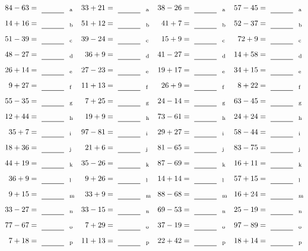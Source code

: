 \documentclass
[
  draft    = true,
  fontsize = 11pt,
  parskip  = half-
]
{scrartcl}
\begin{document}
\clearpage
\begin{align*}
    \pline{84-63}&=\rline{a}
  & \pline{33+21}&=\rline{a}
  & \pline{38-26}&=\rline{a}
  & \pline{57-45}&=\rline{a} \\[1ex]
    \pline{14+16}&=\rline{b}
  & \pline{51+12}&=\rline{b}
  & \pline{41+7}&=\rline{b}
  & \pline{52-37}&=\rline{b} \\[1ex]
    \pline{51-39}&=\rline{c}
  & \pline{39-24}&=\rline{c}
  & \pline{15+9}&=\rline{c}
  & \pline{72+9}&=\rline{c} \\[1ex]
    \pline{48-27}&=\rline{d}
  & \pline{36+9}&=\rline{d}
  & \pline{41-27}&=\rline{d}
  & \pline{14+58}&=\rline{d} \\[1ex]
    \pline{26+14}&=\rline{e}
  & \pline{27-23}&=\rline{e}
  & \pline{19+17}&=\rline{e}
  & \pline{34+15}&=\rline{e} \\[1ex]
    \pline{9+27}&=\rline{f}
  & \pline{11+13}&=\rline{f}
  & \pline{26+9}&=\rline{f}
  & \pline{8+22}&=\rline{f} \\[1ex]
    \pline{55-35}&=\rline{g}
  & \pline{7+25}&=\rline{g}
  & \pline{24-14}&=\rline{g}
  & \pline{63-45}&=\rline{g} \\[1ex]
    \pline{12+44}&=\rline{h}
  & \pline{19+9}&=\rline{h}
  & \pline{73-61}&=\rline{h}
  & \pline{24+24}&=\rline{h} \\[1ex]
    \pline{35+7}&=\rline{i}
  & \pline{97-81}&=\rline{i}
  & \pline{29+27}&=\rline{i}
  & \pline{58-44}&=\rline{i} \\[1ex]
    \pline{18+36}&=\rline{j}
  & \pline{21+6}&=\rline{j}
  & \pline{81-65}&=\rline{j}
  & \pline{83-75}&=\rline{j} \\[1ex]
    \pline{44+19}&=\rline{k}
  & \pline{35-26}&=\rline{k}
  & \pline{87-69}&=\rline{k}
  & \pline{16+11}&=\rline{k} \\[1ex]
    \pline{36+9}&=\rline{l}
  & \pline{9+26}&=\rline{l}
  & \pline{14+14}&=\rline{l}
  & \pline{57+15}&=\rline{l} \\[1ex]
    \pline{9+15}&=\rline{m}
  & \pline{33+9}&=\rline{m}
  & \pline{88-68}&=\rline{m}
  & \pline{16+24}&=\rline{m} \\[1ex]
    \pline{33-27}&=\rline{n}
  & \pline{33-15}&=\rline{n}
  & \pline{69-53}&=\rline{n}
  & \pline{25-19}&=\rline{n} \\[1ex]
    \pline{77-67}&=\rline{o}
  & \pline{7+29}&=\rline{o}
  & \pline{37-19}&=\rline{o}
  & \pline{97-89}&=\rline{o} \\[1ex]
    \pline{7+18}&=\rline{p}
  & \pline{11+13}&=\rline{p}
  & \pline{22+42}&=\rline{p}
  & \pline{18+14}&=\rline{p}
\end{align*}
\end{document}
